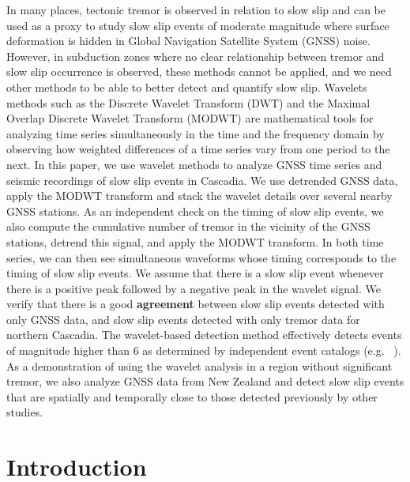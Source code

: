 \documentclass{article}
\begin{document}
In many places, tectonic tremor is observed in relation to slow slip and can be used as a proxy to study slow slip events of moderate magnitude where surface deformation is hidden in Global Navigation Satellite System (GNSS) noise. However, in subduction zones where no clear relationship between tremor and slow slip occurrence is observed, these methods cannot be applied, and we need other methods to be able to better detect and quantify slow slip. Wavelets methods such as the Discrete Wavelet Transform (DWT) and the Maximal Overlap Discrete Wavelet Transform (MODWT) are mathematical tools for analyzing time series simultaneously in the time and the frequency domain by observing how weighted differences of a time series vary from one period to the next. In this paper, we use wavelet methods to analyze GNSS time series and seismic recordings of slow slip events in Cascadia. We use detrended GNSS data, apply the MODWT transform and stack the wavelet details over several nearby GNSS stations. As an independent check on the timing of slow slip events, we also compute the cumulative number of tremor in the vicinity of the GNSS stations, detrend this signal, and apply the MODWT transform. In both time series, we can then see simultaneous waveforms whose timing corresponds to the timing of slow slip events. We assume that there is a slow slip event whenever there is a positive peak followed by a negative peak in the wavelet signal. We verify that there is a good \textbf{agreement} between slow slip events detected with only GNSS data, and slow slip events detected with only tremor data for northern Cascadia. The wavelet-based detection method effectively detects events of magnitude higher than 6 as determined by independent event catalogs (e.g. ~\citep{MIC_2019}). As a demonstration of using the wavelet analysis in a region without significant tremor, we also analyze GNSS data from New Zealand and detect slow slip events that are spatially and temporally close to those detected previously by other studies.

\section{Introduction}
\end{document}
